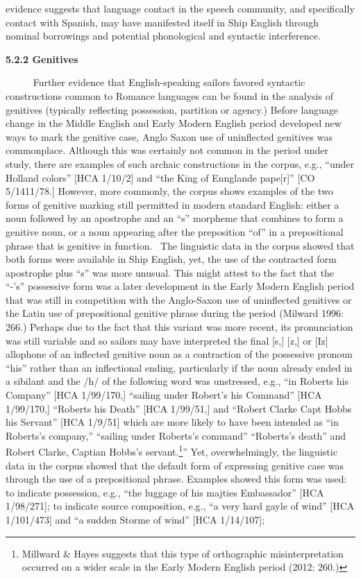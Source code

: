 \documentclass[12pt]{article}
\newenvironment{styleStandard}{\renewcommand\baselinestretch{1.0}\setlength\leftskip{0cm}\setlength\rightskip{0cm plus 1fil}\setlength\parindent{0cm}\setlength\parfillskip{0pt plus 1fil}\setlength\parskip{0in plus 1pt}\writerlistparindent\writerlistleftskip\leavevmode\normalfont\normalsize\writerlistlabel\ignorespaces}{\unskip\vspace{0in plus 1pt}\par}
\newcommand\writerlistleftskip{}
\newcommand\writerlistparindent{}
\newcommand\writerlistlabel{}
\begin{document}
\begin{styleStandard}
evidence suggests that language contact in the speech community, and specifically contact with Spanish, may have manifested itself in Ship English through nominal borrowings and potential phonological and syntactic interference. ~
\end{styleStandard}


\begin{styleStandard}
\textbf{5.2.2 Genitives}
\end{styleStandard}


\begin{styleStandard}
~~~ \ \ Further evidence that English-speaking sailors favored syntactic constructions common to Romance languages can be found in the analysis of genitives (typically reflecting possession, partition or agency.) Before language change in the Middle English and Early Modern English period developed new ways to mark the genitive case, Anglo Saxon use of uninflected genitives was commonplace. Although this was certainly not common in the period under study, there are examples of such archaic constructions in the corpus, e.g., “under Holland colors” [HCA 1/10/2] and “the King of Ennglande pape[r]” [CO 5/1411/78.] However, more commonly, the corpus shows examples of the two forms of genitive marking still permitted in modern standard English: either a noun followed by an apostrophe and an “s” morpheme that combines to form a genitive noun, or a noun appearing after the preposition “of” in a prepositional phrase that is genitive in function. ~The linguistic data in the corpus showed that both forms were available in Ship English, yet, the use of the contracted form apostrophe plus “s” was more unusual. This might attest to the fact that the “-’s” possessive form was a later development in the Early Modern English period that was still in competition with the Anglo-Saxon use of uninflected genitives or the Latin use of prepositional genitive phrase during the period (Milward 1996: 266.) Perhaps due to the fact that this variant was more recent, its pronunciation was still variable and so sailors may have interpreted the final [s,] [z,] or [Iz] allophone of an inflected genitive noun as a contraction of the possessive pronoun “his” rather than an inflectional ending, particularly if the noun already ended in a sibilant and the /h/ of the following word was unstressed, e.g., “in Roberts his Company” [HCA 1/99/170,] “sailing under Robert’s his Command” [HCA 1/99/170,] “Roberts his Death” [HCA 1/99/51,] and “Robert Clarke Capt Hobbs his Servant” [HCA 1/9/51] which are more likely to have been intended as “in Roberts’s company,” “sailing under Roberts’s command” “Roberts’s death” and Robert Clarke, Captian Hobbs’s servant.\footnote{ Millward \& Hayes suggests that this type of orthographic misinterpretation occurred on a wider scale in the Early Modern English period (2012: 260.)}” Yet, overwhelmingly, the linguistic data in the corpus showed that the default form of expressing genitive case was through the use of a prepositional phrase. Examples showed this form was used: to indicate possession, e.g., “the luggage of his majties Embassador” [HCA 1/98/271]; to indicate source composition, e.g., “a very hard gayle of wind” [HCA 1/101/473] and “a sudden Storme of wind” [HCA 1/14/107]; 
\end{styleStandard}
\end{document}

